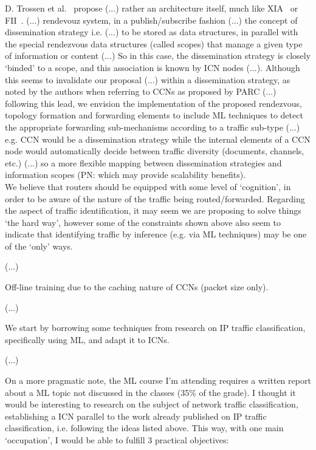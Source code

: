 D. Trossen et al.~\cite{Trossen2012} propose (...) rather an architecture itself, 
much like XIA~\cite{Anand2011} or FII~\cite{Ghodsi2011a}. 
(...) rendevouz system, in a publish/subscribe fashion (...) the concept of 
dissemination strategy i.e. (...) to be stored as data structures, in parallel 
with the special rendezvous data structures (called scopes) that manage a given 
type of information or content (...) So in this case, the dissemination strategy 
is closely `binded' to a scope, and this association is known by ICN nodes 
(...). Although this seems to invalidate our proposal (...) within a 
dissemination strategy, as noted by the authors when referring to CCNs as 
proposed by PARC (...) following this lead, we envision the implementation of 
the proposed rendezvous, topology formation and forwarding elements to include 
ML techniques to detect the appropriate forwarding sub-mechanisms according to 
a traffic sub-type (...) e.g. CCN would be a dissemination strategy while the 
internal elements of a CCN node would automatically decide between traffic 
diversity (documents, channels, etc.) (...) so a more flexible mapping between 
dissemination strategies and information scopes (PN: which may provide 
scalability benefits).\\

We believe that routers should be equipped with some level of `cognition', in 
order to be aware of the nature of the traffic being routed\slash forwarded. 
Regarding the aspect of traffic identification, it may seem we are proposing 
to solve things `the hard way', however some of the constraints shown above 
also seem to indicate that identifying traffic by inference (e.g. via ML 
techniques) may be one of the `only' ways.

(...)

Off-line training due to the caching nature of CCNs (packet size only).

(...)

We start by borrowing some techniques from research on IP traffic 
classification, specifically using ML, and adapt it to ICNs.

(...)

On a more pragmatic note, the  ML course I'm attending requires a written 
report about a ML topic not discussed in the classes (35\% of the grade). I 
thought it would be interesting to research on the subject of network traffic 
classification, establishing a ICN parallel to the work already published on IP 
traffic classification, i.e. following the ideas listed above. This way, with 
one main `occupation', I would be able to fulfill 3 practical objectives:

